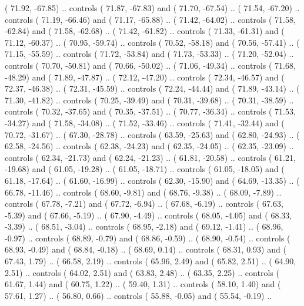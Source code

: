 {        (  71.92, -67.85) .. controls (  71.87, -67.83) and (  71.70, -67.54) ..
        (  71.54, -67.20) .. controls (  71.19, -66.46) and (  71.17, -65.88) ..
        (  71.42, -64.02) .. controls (  71.58, -62.84) and (  71.58, -62.68) ..
        (  71.42, -61.82) .. controls (  71.33, -61.31) and (  71.12, -60.37) ..
        (  70.95, -59.74) .. controls (  70.52, -58.18) and (  70.56, -57.41) ..
        (  71.15, -55.59) .. controls (  71.72, -53.84) and (  71.73, -53.33) ..
        (  71.20, -52.04) .. controls (  70.70, -50.81) and (  70.66, -50.02) ..
        (  71.06, -49.34) .. controls (  71.68, -48.29) and (  71.89, -47.87) ..
        (  72.12, -47.20) .. controls (  72.34, -46.57) and (  72.37, -46.38) ..
        (  72.31, -45.59) .. controls (  72.24, -44.44) and (  71.89, -43.14) ..
        (  71.30, -41.82) .. controls (  70.25, -39.49) and (  70.31, -39.68) ..
        (  70.31, -38.59) .. controls (  70.32, -37.65) and (  70.35, -37.51) ..
        (  70.77, -36.34) .. controls (  71.53, -34.27) and (  71.58, -34.08) ..
        (  71.52, -33.46) .. controls (  71.41, -32.44) and (  70.72, -31.67) ..
        (  67.30, -28.78) .. controls (  63.59, -25.63) and (  62.80, -24.93) ..
        (  62.58, -24.56) .. controls (  62.38, -24.23) and (  62.35, -24.05) ..
        (  62.35, -23.09) .. controls (  62.34, -21.73) and (  62.24, -21.23) ..
        (  61.81, -20.58) .. controls (  61.21, -19.68) and (  61.05, -19.28) ..
        (  61.05, -18.71) .. controls (  61.05, -18.05) and (  61.18, -17.64) ..
        (  61.60, -16.99) .. controls (  62.30, -15.90) and (  64.69, -13.35) ..
        (  66.78, -11.46) .. controls (  68.60,  -9.81) and (  68.76,  -9.38) ..
        (  68.09,  -7.89) .. controls (  67.78,  -7.21) and (  67.72,  -6.94) ..
        (  67.68,  -6.19) .. controls (  67.63,  -5.39) and (  67.66,  -5.19) ..
        (  67.90,  -4.49) .. controls (  68.05,  -4.05) and (  68.33,  -3.39) ..
        (  68.51,  -3.04) .. controls (  68.95,  -2.18) and (  69.12,  -1.41) ..
        (  68.96,  -0.97) .. controls (  68.89,  -0.79) and (  68.86,  -0.59) ..
        (  68.90,  -0.54) .. controls (  68.93,  -0.49) and (  68.84,  -0.18) ..
        (  68.69,   0.14) .. controls (  68.31,   0.93) and (  67.43,   1.79) ..
        (  66.58,   2.19) .. controls (  65.96,   2.49) and (  65.82,   2.51) ..
        (  64.90,   2.51) .. controls (  64.02,   2.51) and (  63.83,   2.48) ..
        (  63.35,   2.25) .. controls (  61.67,   1.44) and (  60.75,   1.22) ..
        (  59.40,   1.31) .. controls (  58.10,   1.40) and (  57.61,   1.27) ..
        (  56.80,   0.66) .. controls (  55.88,  -0.05) and (  55.54,  -0.19) ..
}

